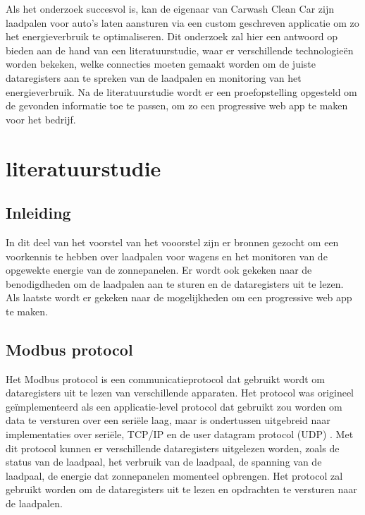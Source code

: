 Als het onderzoek succesvol is, kan de eigenaar van Carwash Clean Car zijn laadpalen voor auto's laten aansturen via een custom geschreven applicatie om zo het energieverbruik te optimaliseren. Dit onderzoek zal hier een antwoord op bieden aan de hand van een literatuurstudie, waar er verschillende technologieën worden bekeken, welke connecties moeten gemaakt worden om de juiste dataregisters aan te spreken van de laadpalen en monitoring van het energieverbruik. Na de literatuurstudie wordt er een proefopstelling opgesteld om de gevonden informatie toe te passen, om zo een progressive web app te maken voor het bedrijf.


\section{literatuurstudie}%
\label{sec:literatuurstudie}

\subsection{Inleiding}%
\label{sub:inleiding_literatuurstudie}
In dit deel van het voorstel van het vooorstel zijn er bronnen gezocht om een voorkennis te hebben over laadpalen voor wagens en het monitoren van de opgewekte energie van de zonnepanelen. Er wordt ook gekeken naar de benodigdheden om de laadpalen aan te sturen en de dataregisters uit te lezen. Als laatste wordt er gekeken naar de mogelijkheden om een progressive web app te maken.

\subsection{Modbus protocol}%
\label{sub:modbus_protocol}
Het Modbus protocol is een communicatieprotocol dat gebruikt wordt om dataregisters uit te lezen van verschillende apparaten. Het protocol was origineel geïmplementeerd als een applicatie-level protocol dat gebruikt zou worden om data te versturen over een seriële laag, maar is ondertussen uitgebreid naar implementaties over seriële, TCP/IP en de user datagram protocol (UDP) \autocite{NI2023}. Met dit protocol kunnen er verschillende dataregisters uitgelezen worden, zoals de status van de laadpaal, het verbruik van de laadpaal, de spanning van de laadpaal, de energie dat zonnepanelen momenteel opbrengen. Het protocol zal gebruikt worden om de dataregisters uit te lezen en opdrachten te versturen naar de laadpalen.

